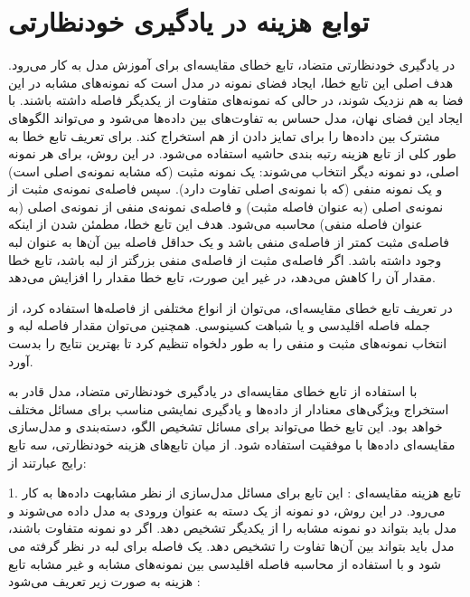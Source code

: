 \section{ توابع هزینه در یادگیری خودنظارتی}

در یادگیری خودنظارتی متضاد، تابع خطای مقایسه‌ای برای آموزش مدل به کار می‌رود. هدف اصلی این تابع خطا، ایجاد فضای نمونه در مدل است که نمونه‌های مشابه در این فضا به هم نزدیک شوند، در حالی که نمونه‌های متفاوت از یکدیگر فاصله داشته باشند. با ایجاد این فضای نهان، مدل حساس به تفاوت‌های بین داده‌ها می‌شود و می‌تواند الگوهای مشترک بین داده‌ها را برای تمایز دادن از هم استخراج کند.
\citep{falcon2020framework}
برای تعریف تابع خطا به طور کلی از تابع هزینه رتبه بندی حاشیه  استفاده می‌شود. در این روش، برای هر نمونه اصلی، دو نمونه دیگر انتخاب می‌شوند: یک نمونه مثبت (که مشابه نمونه‌ی اصلی است) و یک نمونه منفی (که با نمونه‌ی اصلی تفاوت دارد). سپس فاصله‌ی نمونه‌ی مثبت از نمونه‌ی اصلی (به عنوان فاصله مثبت) و فاصله‌ی نمونه‌ی منفی از نمونه‌ی اصلی (به عنوان فاصله منفی) محاسبه می‌شود. هدف این تابع خطا، مطمئن شدن از اینکه فاصله‌ی مثبت کمتر از فاصله‌ی منفی باشد و یک حداقل فاصله بین آن‌ها به عنوان لبه وجود داشته باشد. اگر فاصله‌ی مثبت از فاصله‌ی منفی بزرگتر از لبه باشد، تابع خطا مقدار آن را کاهش می‌دهد، در غیر این صورت،  تابع خطا مقدار را افزایش می‌دهد.

در تعریف تابع خطای مقایسه‌ای، می‌توان از انواع مختلفی از فاصله‌ها استفاده کرد، از جمله فاصله اقلیدسی و یا شباهت کسینوسی. همچنین می‌توان مقدار فاصله لبه و انتخاب نمونه‌های مثبت و منفی را به طور دلخواه تنظیم کرد تا بهترین نتایج را بدست آورد.

با استفاده از تابع خطای مقایسه‌ای در یادگیری خودنظارتی متضاد، مدل قادر به استخراج ویژگی‌های معنادار از داده‌ها و یادگیری نمایشی مناسب برای مسائل مختلف خواهد بود. این تابع خطا می‌تواند برای مسائل تشخیص الگو، دسته‌بندی و مدل‌سازی مقایسه‌ای داده‌ها با موفقیت استفاده شود.
\citep{jiao2022timeautoad}
از میان تابع‌های هزینه خودنظارتی، سه تابع رایج عبارتند از:

1. تابع هزینه مقایسه‌ای  : 
این تابع برای مسائل مدل‌سازی از نظر مشابهت داده‌ها به کار می‌رود. در این روش، دو نمونه از یک دسته به عنوان ورودی به مدل داده می‌شوند و مدل باید بتواند دو نمونه مشابه را از یکدیگر تشخیص دهد. اگر دو نمونه متفاوت باشند، مدل باید بتواند بین آن‌ها تفاوت را تشخیص دهد. یک فاصله برای لبه در نظر گرفته می شود و با استفاده از محاسبه فاصله اقلیدسی بین نمونه‌های مشابه و غیر مشابه تابع هزینه به صورت زیر تعریف می‌شود :


